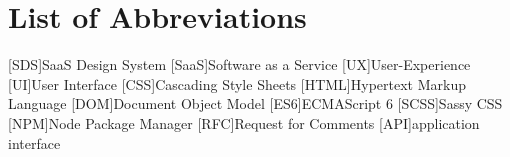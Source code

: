 \section*{List of Abbreviations}
\begin{acronym}
    [SDS]{SaaS Design System}
    [SaaS]{Software as a Service}
    [UX]{User-Experience}
    [UI]{User Interface}
    [CSS]{Cascading Style Sheets}
    [HTML]{Hypertext Markup Language}
    [DOM]{Document Object Model}
    [ES6]{ECMAScript 6}
    [SCSS]{Sassy CSS}
    [NPM]{Node Package Manager}
    [RFC]{Request for Comments}
    [API]{application interface}

\end{acronym}